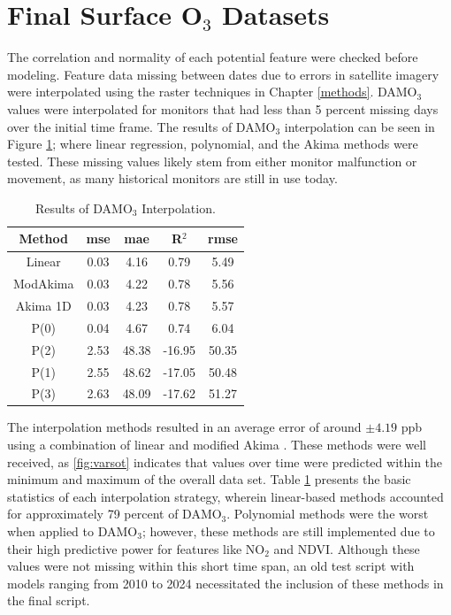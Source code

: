 \section{Final Surface O$_3$ Datasets} \label{tmas:findatasets} The correlation and normality of each potential feature were checked before modeling. Feature data missing between dates due to errors in satellite imagery were interpolated using the raster techniques in Chapter \ref{methods}. DAMO$_3$ values were interpolated for monitors that had less than 5 percent missing days over the initial time frame. The results of DAMO$_3$ interpolation can be seen in Figure \ref{tab:interpolation}; where linear regression, polynomial, and the Akima methods were tested. These missing values likely stem from either monitor malfunction or movement, as many historical monitors are still in use today. \begin{table}[h!]
    \centering
    \begin{tabular}{ccccc}
        \hline
        \textbf{Method} & \textbf{mse} & \textbf{mae} & \textbf{R$^2$} & \textbf{rmse} \\
        \hline
        Linear   &  0.03 & 4.16 &  0.79 & 5.49 \\
        ModAkima &  0.03 & 4.22 &  0.78 & 5.56 \\
        Akima 1D &  0.03 & 4.23 &  0.78 & 5.57 \\
        P(0)     &  0.04 & 4.67 &  0.74 & 6.04 \\
        P(2)     &  2.53 & 48.38 &-16.95 & 50.35 \\
        P(1)     &  2.55 & 48.62 &-17.05 & 50.48 \\
        P(3)     &  2.63 & 48.09 &-17.62 & 51.27 \\
       \hline
    \end{tabular}
    \caption{Results of DAMO$_3$ Interpolation.}
    \label{tab:interpolation}
\end{table} The interpolation methods resulted in an average error of around $\pm{4.19}$ ppb using a combination of linear and modified Akima \parencite{akima_new_1970}. These methods were well received, as \ref{fig:varsot} indicates that values over time were predicted within the minimum and maximum of the overall data set. Table \ref{tab:interpolation} presents the basic statistics of each interpolation strategy, wherein linear-based methods accounted for approximately 79 percent of DAMO$_3$. Polynomial methods were the worst when applied to DAMO$_3$; however, these methods are still implemented due to their high predictive power for features like NO$_2$ and NDVI. Although these values were not missing within this short time span, an old test script with models ranging from 2010 to 2024 necessitated the inclusion of these methods in the final script. 

